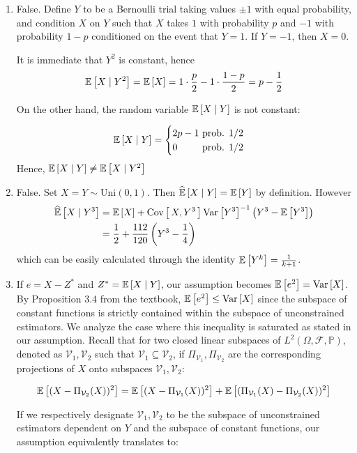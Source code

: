 \documentclass[12pt]{article}%
\begin{document}
\begin{enumerate}
  \item False. Define $Y$ to be a Bernoulli trial taking values $\pm 1$ with equal probability, and condition $X$ on $Y$ such that $X$ takes $1$ with probability $p$ and $-1$ with probability $1-p$ conditioned on the event that $Y = 1$. If $Y = -1$, then $X = 0$.

  It is immediate that $Y^2$ is constant, hence \[ \mathbb{E}\left[{X}\mid {Y^2}\right] = \mathbb{E}\left[X\right] = 1\cdot \frac{p}{2} - 1 \cdot \frac{1-p}{2} = p - \frac{1}{2}\]

  On the other hand, the random variable $\mathbb{E}\left[{X}\mid {Y}\right]$ is not constant:

  \[\mathbb{E}\left[{X}\mid {Y}\right] = \begin{cases}
    2p - 1 \text{ prob. } 1/2 \\
    0\phantom{p - 1} \text{ prob. } 1/2
  \end{cases}\]
  Hence, $\mathbb{E}\left[{X}\mid {Y}\right] \neq \mathbb{E}\left[{X}\mid {Y^2}\right]$

  \item
  False. Set $X = Y \sim \text{Uni}(0,1)$. Then  $\widehat{ \mathbb{E}}\left[{X} \mid {Y}\right] = \mathbb{E}\left[Y\right]$ by definition. However
  \begin{align*}
    \widehat{ \mathbb{E}}\left[{X} \mid {Y^3}\right] & = \mathbb{E}\left[X\right] + \text{Cov}\left[\,X,Y^3\,\right]\text{Var}\left[Y^3\right]^{-1}\left(Y^3 - \mathbb{E}\left[Y^3\right]\right) \\
    & = \frac{1}{2} + \frac{112}{120}\left(Y^3  - \frac{1}{4}\right)
  \end{align*}
  which can be easily calculated through the identity $\mathbb{E}\left[Y^k\right] = \frac{1}{k+1}$.

  \item
  If $e = X - Z^*$ and $Z^* = \mathbb{E}\left[{X}\mid {Y}\right]$, our assumption becomes $\mathbb{E}\left[e^2\right] = \text{Var}\left[X\right]$. By Proposition 3.4 from the textbook, $\mathbb{E}\left[e^2\right] \leq \text{Var}\left[X\right]$ since the subspace of constant functions is strictly contained within the subspace of unconstrained estimators. We analyze the case where this inequality is saturated as stated in our assumption. Recall that for two closed linear subspaces of $L^2(\Omega,\mathcal{F},\mathbb{P})$, denoted as $\mathcal{V}_1, \mathcal{V}_2 $ such that $\mathcal{V}_1 \subseteq \mathcal{V}_2$, if $\Pi_{\mathcal{V}_1}, \Pi_{\mathcal{V}_2}$ are the corresponding projections of $X$ onto subspaces $\mathcal{V}_1, \mathcal{V}_2$:

  \[ \mathbb{E}\left[(X - \Pi_{\mathcal{V}_2}(X))^2\right] =  \mathbb{E}\left[(X - \Pi_{\mathcal{V}_1}(X))^2\right] +  \mathbb{E}\left[(\Pi_{\mathcal{V}_1}(X) - \Pi_{\mathcal{V}_2}(X))^2\right]\]

  If we respectively designate $\mathcal{V}_1,\mathcal{V}_2$ to be the subspace of unconstrained estimators dependent on $Y$ and the subspace of constant functions, our assumption equivalently translates to:


\end{enumerate}
\end{document}
